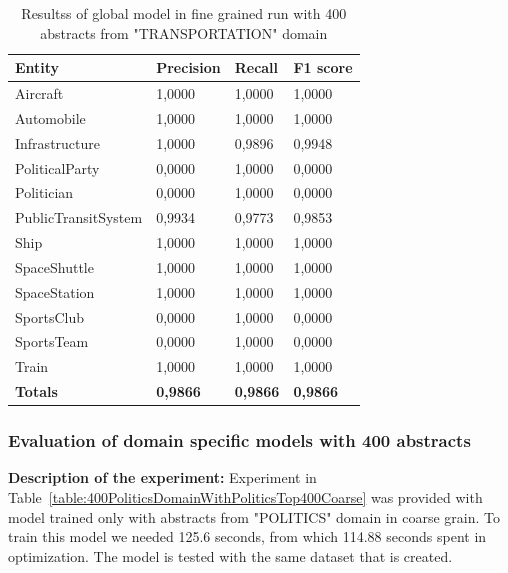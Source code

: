 \documentclass[thesis=M,english]{FITthesis}[2018/05/30]
\begin{document}
	\begin{table}[H]\centering
		\begin{tabular}{|l|l|l|l|}
			\hline {\textbf{Entity}} & {\textbf{Precision}} & {\textbf{Recall}} & {\textbf{F1 score}}\\\hline
				Aircraft & 1,0000 & 1,0000 & 1,0000\\
				Automobile & 1,0000 & 1,0000 & 1,0000\\				
				Infrastructure & 1,0000 & 0,9896 & 0,9948\\
				PoliticalParty & 0,0000 & 1,0000 & 0,0000\\				
				Politician & 0,0000 & 1,0000 & 0,0000\\				
				PublicTransitSystem & 0,9934 & 0,9773 & 0,9853\\
				Ship & 1,0000 & 1,0000 & 1,0000\\				
				SpaceShuttle & 1,0000 & 1,0000 & 1,0000\\
				SpaceStation & 1,0000 & 1,0000 & 1,0000\\
				SportsClub & 0,0000 & 1,0000 & 0,0000\\
				SportsTeam & 0,0000 & 1,0000 & 0,0000\\
				Train & 1,0000 & 1,0000 & 1,0000\\\hline
				\textbf{Totals} & \textbf{0,9866} & \textbf{0,9866} & \textbf{0,9866}\\\hline
		\end{tabular}
		\caption{Resultss of global model in fine grained run with 400 abstracts from "TRANSPORTATION" domain \label{table:400GlobalDomainWithTransportationTop400Fine}}
	\end{table}		
	

\subsubsection{Evaluation of domain specific models with 400 abstracts}

\textbf{Description of the experiment:} Experiment in Table~\ref{table:400PoliticsDomainWithPoliticsTop400Coarse} was provided with model trained only with abstracts from "POLITICS" domain in coarse grain. To train this model we needed 125.6 seconds, from which 114.88 seconds spent in optimization. The model is tested with the same dataset that is created.
\end{document}
